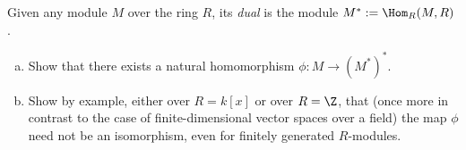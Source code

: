 \begin{problem}
Given any module $M$ over the ring $R$, its \emph{dual} is the module $M^* := \Hom_R(M,R)$. 

\begin{enumerate}[(a)]
  \item Show that there exists a natural homomorphism $\phi : M \to (M^*)^*$.
  \item Show by example, either  over $R = k[x]$ or over $R = \Z$, that (once more in contrast to the case of finite-dimensional vector spaces over a field) the map $\phi$ need not be an isomorphism, even for finitely generated $R$-modules.
\end{enumerate}
\end{problem}